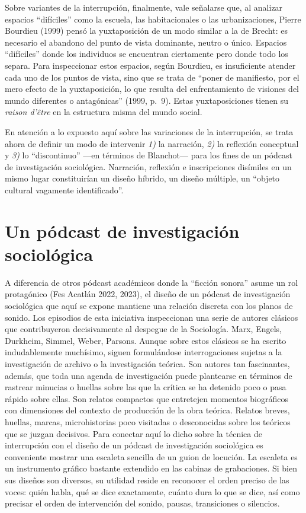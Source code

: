 \documentclass[
]{interact}
\begin{document}
Sobre variantes de la interrupción, finalmente, vale señalarse que, al
analizar espacios ``difíciles'' como la escuela, las habitacionales o
las urbanizaciones, Pierre Bourdieu (1999) pensó la yuxtaposición de un
modo similar a la de Brecht: es necesario el abandono del punto de vista
dominante, neutro o único. Espacios ``difíciles'' donde los individuos
se encuentran ciertamente pero donde todo los separa. Para inspeccionar
estos espacios, según Bourdieu, es insuficiente atender cada uno de los
puntos de vista, sino que se trata de ``poner de manifiesto, por el mero
efecto de la yuxtaposición, lo que resulta del enfrentamiento de
visiones del mundo diferentes o antagónicas'' (1999, p.~9). Estas
yuxtaposiciones tienen su \emph{raison d'être} en la estructura misma
del mundo social.

En atención a lo expuesto aquí sobre las variaciones de la interrupción,
se trata ahora de definir un modo de intervenir \emph{1)} la narración,
\emph{2)} la reflexión conceptual y \emph{3)} lo ``discontinuo'' ---en
términos de Blanchot--- para los fines de un pódcast de investigación
sociológica. Narración, reflexión e inscripciones disímiles en un mismo
lugar constituirían un diseño híbrido, un diseño múltiple, un ``objeto
cultural vagamente identificado''.

\section{Un pódcast de investigación
sociológica}\label{un-puxf3dcast-de-investigaciuxf3n-socioluxf3gica}

A diferencia de otros pódcast académicos donde la ``ficción sonora''
asume un rol protagónico (Fes Acatlán 2022, 2023), el diseño de un
pódcast de investigación sociológica que aquí se expone mantiene una
relación discreta con los planos de sonido. Los episodios de esta
iniciativa inspeccionan una serie de autores clásicos que contribuyeron
decisivamente al despegue de la Sociología. Marx, Engels, Durkheim,
Simmel, Weber, Parsons. Aunque sobre estos clásicos se ha escrito
indudablemente muchísimo, siguen formulándose interrogaciones sujetas a
la investigación de archivo o la investigación teórica. Son autores tan
fascinantes, además, que toda una agenda de investigación puede
plantearse en términos de rastrear minucias o huellas sobre las que la
crítica se ha detenido poco o pasa rápido sobre ellas. Son relatos
compactos que entretejen momentos biográficos con dimensiones del
contexto de producción de la obra teórica. Relatos breves, huellas,
marcas, microhistorias poco visitadas o desconocidas sobre los teóricos
que se juzgan decisivos. Para conectar aquí lo dicho sobre la técnica de
interrupción con el diseño de un pódcast de investigación sociológica es
conveniente mostrar una escaleta sencilla de un guion de locución. La
escaleta es un instrumento gráfico bastante extendido en las cabinas de
grabaciones. Si bien sus diseños son diversos, su utilidad reside en
reconocer el orden preciso de las voces: quién habla, qué se dice
exactamente, cuánto dura lo que se dice, así como precisar el orden de
intervención del sonido, pausas, transiciones o silencios.
\end{document}
